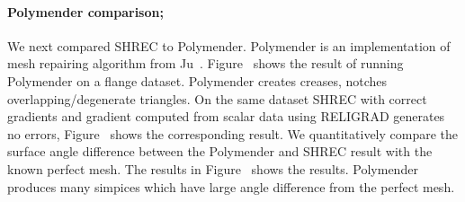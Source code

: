 \paragraph{Polymender comparison;}
We next compared SHREC to Polymender. Polymender is an implementation of mesh repairing algorithm from Ju~\cite{j-rrpm-04}. Figure~\protect{} shows the result of running Polymender on a flange dataset. Polymender creates creases, notches overlapping/degenerate triangles. On the same dataset SHREC with correct gradients and gradient computed from scalar data using RELIGRAD generates no errors, Figure~\protect{} shows the corresponding result. We quantitatively compare the surface angle difference between the Polymender and SHREC result with the known perfect mesh. 
The results in Figure~\protect{} shows the results. Polymender produces many simpices which have large angle difference from the perfect mesh. 
